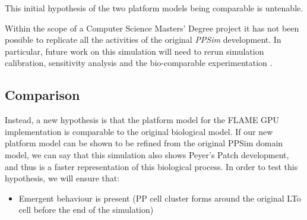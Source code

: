 \documentclass{UoYCSproject}
\begin{document}
This initial hypothesis of the two platform models being comparable is untenable.

Within the scope of a Computer Science Masters' Degree project it has not been possible to replicate all the activities of the original \textit{PPSim} development.
In particular, future work on this simulation will need to rerun simulation calibration, sensitivity analysis and the bio-comparable experimentation \cite{kieran_thesis, kieran_results}.

\subsection{Comparison}
Instead, a new hypothesis is that the platform model for the \gls{FLAME GPU} implementation is comparable to the original biological model.
If our new platform model can be shown to be refined from the original PPSim domain model, we can say that this simulation also shows Peyer's Patch development, and thus is a faster representation of this biological process.
In order to test this hypothesis, we will ensure that:
\begin{itemize}
    \item Emergent behaviour is present (\gls{PP} cell cluster forms around the original \gls{LTo} cell before the end of the simulation)
\end{itemize}
\end{document}
